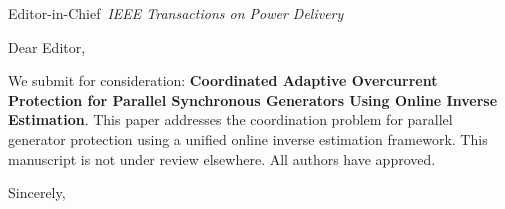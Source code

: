 \documentclass[11pt,a4paper]{letter}
\begin{document}
\begin{letter}{Editor-in-Chief\ \textit{IEEE Transactions on Power Delivery}}
\opening{Dear Editor,}
We submit for consideration: \textbf{Coordinated Adaptive Overcurrent Protection for Parallel Synchronous Generators Using Online Inverse Estimation}.
This paper addresses the coordination problem for parallel generator protection using a unified online inverse estimation framework.
This manuscript is not under review elsewhere. All authors have approved.
\closing{Sincerely,}
\end{letter}
\end{document}

